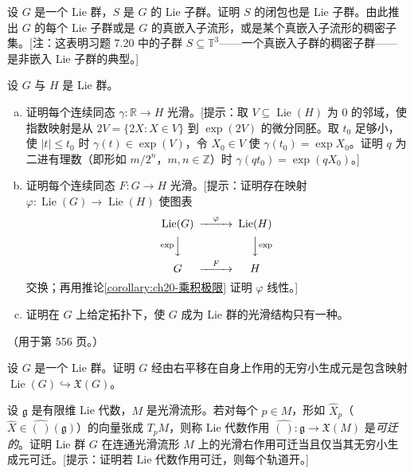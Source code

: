 \documentclass[../../main.tex]{subfiles}
\begin{document}
\begin{exercise}\label{exercise:ch20-10}
设 $G$ 是一个 Lie 群，$S$ 是 $G$ 的 Lie 子群。证明 $S$ 的闭包也是 Lie 子群。由此推出 $G$ 的每个 Lie 子群或是 $G$ 的真嵌入子流形，或是某个真嵌入子流形的稠密子集。[注：这表明习题 7.20 中的子群 $S\subseteq\mathbb{T}^3$——一个真嵌入子群的稠密子群——是非嵌入 Lie 子群的典型。]
\end{exercise}

\begin{exercise}\label{exercise:ch20-11}
设 $G$ 与 $H$ 是 Lie 群。
\begin{enumerate}[(a)]
\item 证明每个连续同态 $\gamma\colon\mathbb{R}\to H$ 光滑。[提示：取 $V\subseteq\operatorname{Lie}(H)$ 为 $0$ 的邻域，使指数映射是从 $2V=\{2X\colon X\in V\}$ 到 $\exp(2V)$ 的微分同胚。取 $t_0$ 足够小，使 $|t|\leqslant t_0$ 时 $\gamma(t)\in\exp(V)$，令 $X_0\in V$ 使 $\gamma(t_0)=\exp X_0$。证明 $q$ 为二进有理数（即形如 $m/2^n$，$m,n\in\mathbb{Z}$）时 $\gamma(qt_0)=\exp(qX_0)$。]
\item 证明每个连续同态 $F\colon G\to H$ 光滑。[提示：证明存在映射 $\varphi\colon\operatorname{Lie}(G)\to\operatorname{Lie}(H)$ 使图表
\begin{align*}
\begin{CD}
\operatorname{Lie}(G) @>{\varphi}>> \operatorname{Lie}(H)\\
@V{\exp}VV @VV{\exp}V\\
G @>{F}>> H
\end{CD}
\end{align*}
交换；再用推论\cref{corollary:ch20-乘积极限} 证明 $\varphi$ 线性。]
\item 证明在 $G$ 上给定拓扑下，使 $G$ 成为 Lie 群的光滑结构只有一种。
\end{enumerate}
（用于第 556 页。）
\end{exercise}

\begin{exercise}\label{exercise:ch20-12}
设 $G$ 是一个 Lie 群。证明 $G$ 经由右平移在自身上作用的无穷小生成元是包含映射 $\operatorname{Lie}(G)\hookrightarrow\mathfrak X(G)$。
\end{exercise}

\begin{exercise}\label{exercise:ch20-13}
设 $\mathfrak g$ 是有限维 Lie 代数，$M$ 是光滑流形。若对每个 $p\in M$，形如 $\widehat X_p$（$\widehat X\in\widehat{(\,)}(\mathfrak g)$）的向量张成 $T_pM$，则称 Lie 代数作用 $\widehat{(\,)}\colon\mathfrak g\to\mathfrak X(M)$ 是\emph{可迁的}。证明 Lie 群 $G$ 在连通光滑流形 $M$ 上的光滑右作用可迁当且仅当其无穷小生成元可迁。[提示：证明若 Lie 代数作用可迁，则每个轨道开。]
\end{exercise}
\end{document}
